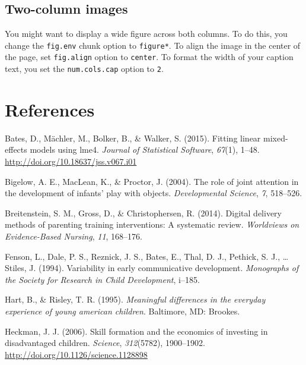 \documentclass[10pt, letterpaper]{article}
\begin{document}
\subsection{Two-column images}\label{two-column-images}

You might want to display a wide figure across both columns. To do this,
you change the \texttt{fig.env} chunk option to \texttt{figure*}. To
align the image in the center of the page, set \texttt{fig.align} option
to \texttt{center}. To format the width of your caption text, you set
the \texttt{num.cols.cap} option to \texttt{2}.

\section{References}\label{references}

\setlength{\parindent}{-0.1in} \setlength{\leftskip}{0.125in} \noindent

\hypertarget{refs}{}
\hypertarget{ref-lme4}{}
Bates, D., Mächler, M., Bolker, B., \& Walker, S. (2015). Fitting linear
mixed-effects models using lme4. \emph{Journal of Statistical Software},
\emph{67}(1), 1--48. \url{http://doi.org/10.18637/jss.v067.i01}

\hypertarget{ref-Bigelow2004}{}
Bigelow, A. E., MacLean, K., \& Proctor, J. (2004). The role of joint
attention in the development of infants' play with objects.
\emph{Developmental Science}, \emph{7}, 518--526.

\hypertarget{ref-Breitenstein2014}{}
Breitenstein, S. M., Gross, D., \& Christophersen, R. (2014). Digital
delivery methods of parenting training interventions: A systematic
review. \emph{Worldviews on Evidence-Based Nursing}, \emph{11},
168--176.

\hypertarget{ref-Fenson1994}{}
Fenson, L., Dale, P. S., Reznick, J. S., Bates, E., Thal, D. J.,
Pethick, S. J., \ldots{} Stiles, J. (1994). Variability in early
communicative development. \emph{Monographs of the Society for Research
in Child Development}, i--185.

\hypertarget{ref-Hart1995}{}
Hart, B., \& Risley, T. R. (1995). \emph{Meaningful differences in the
everyday experience of young american children}. Baltimore, MD: Brookes.

\hypertarget{ref-Heckman2006}{}
Heckman, J. J. (2006). Skill formation and the economics of investing in
disadvantaged children. \emph{Science}, \emph{312}(5782), 1900--1902.
\url{http://doi.org/10.1126/science.1128898}
\end{document}

